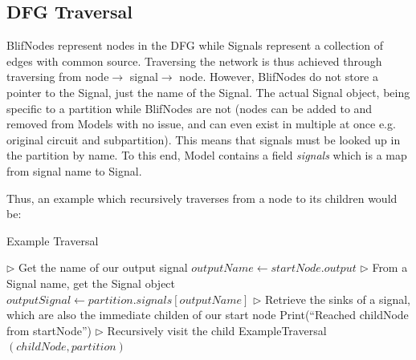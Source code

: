 \documentclass[12pt,final,oneside]{dwThesis} %
\renewcommand\algorithmiccomment[1]{%
  \hfill$\triangleright$\ \parbox[t]{.25\linewidth}{#1}%
}
\begin{document}
   \subsection{\gls{DFG}
      Traversal} BlifNodes represent nodes in the \gls{DFG}
   while Signals represent a collection of edges with common source. Traversing
   the network is thus achieved through traversing from node$\rightarrow$
   signal$\rightarrow$ node. However, \mbox{BlifNodes} do not store a pointer to the
   Signal, just the name of the Signal. The actual Signal object, being
   specific to a partition while BlifNodes are not (nodes can be added to and
   removed from Models with no issue, and can even exist in multiple at once
   e.g. original circuit and subpartition). This means that signals must be
   looked up in the partition by name. To this end, Model contains a field \textit{signals}
    which is a map from signal name to Signal.

   Thus, an example which recursively traverses from a node to its children
   would be: 
\renewcommand\algorithmiccomment[1]{%
  \hfill$\triangleright$\ \parbox[t]{.40\linewidth}{#1}%
}
   \begin{algorithm}
      \caption{Example Traversal}\label{algExTrav}

      \begin{algorithmic}[1]
            \State $\triangleright$ Get the name of our output signal
         \State $outputName \gets startNode.output$
         \State
            \State $\triangleright$ From a Signal name, get the
            Signal object
         \State $outputSignal \gets         partition.signals[outputName]$
         \State
            \State $\triangleright$ Retrieve the sinks of a signal, which are also the immediate
            childen of our start node
         \State Print(``Reached childNode from startNode'')
         \State
            \State $\triangleright$ Recursively visit the child
         \State ExampleTraversal$(childNode, partition)$
          \EndFor
           \EndProcedure

      \end{algorithmic}

   \end{algorithm}
\end{document}
